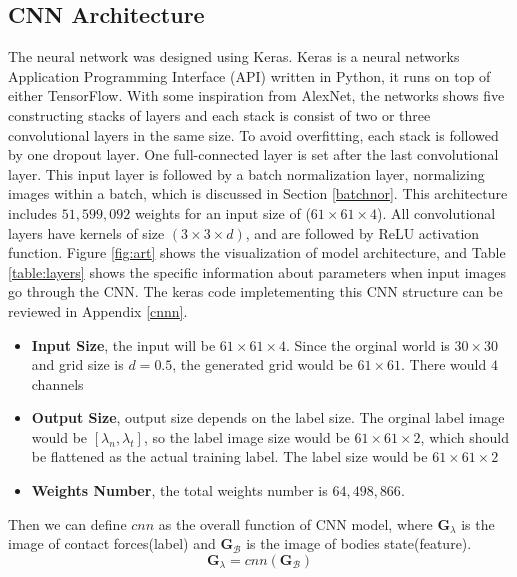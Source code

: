 \subsection{CNN  Architecture}
    The neural network was designed using Keras\cite{chollet2015keras}. Keras is a neural networks Application Programming Interface (API) written in Python, it runs on top of either TensorFlow. With some inspiration from AlexNet\cite{Krizhevsky:2012:ICD:2999134.2999257}, the networks shows five constructing stacks of layers and each stack is consist of two or three convolutional layers in the same size. To avoid overfitting, each stack is followed by one dropout layer. One full-connected layer is set after the last convolutional layer. This input layer is followed by a batch normalization layer, normalizing images within a batch, which is discussed in Section \ref{batchnor}. This architecture includes $51,599,092$ weights for an input size of ($61\times61\times4$). All convolutional layers have kernels of size $(3\times 3\times d)$, and are followed by ReLU activation function. Figure \ref{fig:art} shows the visualization of model architecture, and Table \ref{table:layers} shows the specific information about parameters when input images go through the CNN. The keras code impletementing this CNN structure can be reviewed in Appendix \ref{cnnn}.
    \begin{itemize}
        \item \textbf{Input Size}, the input will be $61\times61\times4$. Since the orginal world is $30\times30$ and grid size is $d=0.5$, the generated grid would be $61\times61$. There would $4$ channels
        \item \textbf{Output Size}, output size depends on the label size. The orginal label image would be $[\lambda_n, \lambda_t]$, so the label image size would be $61\times61\times2$, which should be flattened as the actual training label. The label size would be $61\times 61 \times 2$
        \item \textbf{Weights Number}, the total weights number is $64,498,866$. 
    \end{itemize}
    Then we can define $cnn$ as the overall function of CNN model, where $\pmb{G}_{\lambda}$ is the image of contact forces(label) and $\pmb{G}_{\mathcal{B}}$ is the image of bodies state(feature).
    \begin{equation}
        \pmb{G}_{\lambda} = cnn(\pmb{G}_{\mathcal{B}})
    \end{equation}

